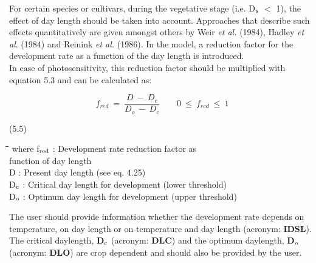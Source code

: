 \documentclass[11pt]{article}
\begin{document}
\bigskip
\bigskip
\bigskip
 For certain species or cultivars, during the vegetative stage (i.e. D$_{{\rm s}}$ $<$ 1), the effect of
day len\-gth should be taken into account. Approaches that describe such effects quantita\-tively are given amongst others by  Weir {\it et al.\/} (1984), Hadley {\it et al\/}. (1984) and Reinink
{\it et al.\/} (1986). In the model, a reduction factor for the development rate as a function of
the day length is intro\-duced. \\
In case of photosensitivity, this reduction factor should be multiplied with equation 5.3
and can be calculated as:

\begin{displaymath}
f _{red} ~=~{\frac{D ~-~D _{c} }{D _{o} ~-~ D _{c} }} ~~~~~~~~~0~\le ~f _{red} ~\le ~1
\end{displaymath}

 \bigskip
\strut\hfill (5.5)

\nwln
\begin{tabbing}
\hspace{1.27cm}\=\hspace{1.27cm}\=\hspace{1.27cm}\=\hspace{1.27cm}\=%
\hspace{1.27cm}\=\hspace{1.27cm}\=\hspace{1.27cm}\=\hspace{1.27cm}\=%
\hspace{1.27cm}\=\hspace{1.27cm}\=\kill
where\> f$_{{\rm red}}$\> : Development rate reduction factor as \\
\>\>   function of day length\> \> \> \> \> \> \> \> [-]\\
\>D\> : Present day length (see eq. 4.25)\> \> \> \> \> \> \> \> [h]\\
\>D$_{{\rm c}}$\> : Critical day length for development (lower threshold)\> \> \> \> \> \> \> \> [h]\\
\>D$_{{\rm o}}$\> : Optimum day length for development (upper threshold)\> \> \> \> \> \> \> \> [h]
\end{tabbing}

\bigskip
The user should provide information whether the development rate depends on tempera\-ture, on day length or on temperature and day length (acronym: {\bf IDSL}). The critical
daylength, {\bf D$_{{\rm c}}$} (acronym: {\bf DLC}) and the optimum daylength, {\bf D$_{{\rm o}}$} (acronym: {\bf DLO}) are crop
depen\-dent and should also be provided by the user. 
\end{document}
